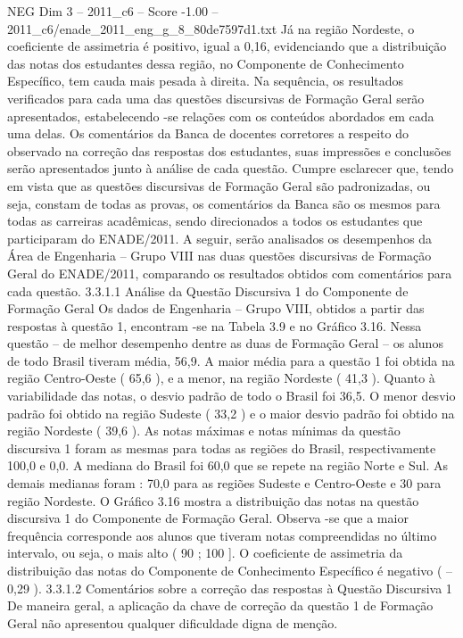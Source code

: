 \begin{textsample}{NEG Dim 3 – 2011\_c6 – Score -1.00 – 2011\_c6/enade\_2011\_eng\_g\_8\_80de7597d1.txt}
Já na região Nordeste, o coeficiente de assimetria é positivo, igual a 0,16, evidenciando que a distribuição das notas dos estudantes dessa região, no Componente de Conhecimento Específico, tem cauda mais pesada à direita.
Na sequência, os resultados verificados para cada uma das questões discursivas de Formação Geral serão apresentados, estabelecendo -se relações com os conteúdos abordados em cada uma delas.
Os comentários da Banca de docentes corretores a respeito do observado na correção das respostas dos estudantes, suas impressões e conclusões serão apresentados junto à análise de cada questão.
Cumpre esclarecer que, tendo em vista que as questões discursivas de Formação Geral são padronizadas, ou seja, constam de todas as provas, os comentários da Banca são os mesmos para todas as carreiras acadêmicas, sendo direcionados a todos os estudantes que participaram do ENADE/2011.
A seguir, serão analisados os desempenhos da Área de Engenharia – Grupo VIII nas duas questões discursivas de Formação Geral do ENADE/2011, comparando os resultados obtidos com comentários para cada questão. 3.3.1.1 Análise da Questão Discursiva 1 do Componente de Formação Geral Os dados de Engenharia – Grupo VIII, obtidos a partir das respostas à questão 1, encontram -se na Tabela 3.9 e no Gráfico 3.16.
Nessa questão – de melhor desempenho dentre as duas de Formação Geral – os alunos de todo Brasil tiveram média, 56,9.
A maior média para a questão 1 foi obtida na região Centro-Oeste ( 65,6 ), e a menor, na região Nordeste ( 41,3 ).
Quanto à variabilidade das notas, o desvio padrão de todo o Brasil foi 36,5.
O menor desvio padrão foi obtido na região Sudeste ( 33,2 ) e o maior desvio padrão foi obtido na região Nordeste ( 39,6 ).
As notas máximas e notas mínimas da questão discursiva 1 foram as mesmas para todas as regiões do Brasil, respectivamente 100,0 e 0,0.
A mediana do Brasil foi 60,0 que se repete na região Norte e Sul.
As demais medianas foram : 70,0 para as regiões Sudeste e Centro-Oeste e 30 para região Nordeste.
O Gráfico 3.16 mostra a distribuição das notas na questão discursiva 1 do Componente de Formação Geral.
Observa -se que a maior frequência corresponde aos alunos que tiveram notas compreendidas no último intervalo, ou seja, o mais alto ( 90 ; 100 ].
O coeficiente de assimetria da distribuição das notas do Componente de Conhecimento Específico é negativo ( – 0,29 ). 3.3.1.2 Comentários sobre a correção das respostas à Questão Discursiva 1 De maneira geral, a aplicação da chave de correção da questão 1 de Formação Geral não apresentou qualquer dificuldade digna de menção.

\end{textsample}
